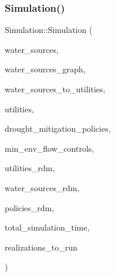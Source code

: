\subsubsection{\texorpdfstring{Simulation()}{Simulation()}\hspace{0.1cm}{\footnotesize\ttfamily [1/3]}}
{\footnotesize\ttfamily Simulation\+::\+Simulation (\begin{DoxyParamCaption}\item[{vector$<$ \mbox{\hyperlink{classWaterSource}{Water\+Source}} $\ast$$>$ \&}]{water\+\_\+sources,  }\item[{\mbox{\hyperlink{classGraph}{Graph}} \&}]{water\+\_\+sources\+\_\+graph,  }\item[{const vector$<$ vector$<$ int $>$$>$ \&}]{water\+\_\+sources\+\_\+to\+\_\+utilities,  }\item[{vector$<$ \mbox{\hyperlink{classUtility}{Utility}} $\ast$$>$ \&}]{utilities,  }\item[{const vector$<$ \mbox{\hyperlink{classDroughtMitigationPolicy}{Drought\+Mitigation\+Policy}} $\ast$$>$ \&}]{drought\+\_\+mitigation\+\_\+policies,  }\item[{vector$<$ \mbox{\hyperlink{classMinEnvFlowControl}{Min\+Env\+Flow\+Control}} $\ast$$>$ \&}]{min\+\_\+env\+\_\+flow\+\_\+controls,  }\item[{vector$<$ vector$<$ double $>$$>$ \&}]{utilities\+\_\+rdm,  }\item[{vector$<$ vector$<$ double $>$$>$ \&}]{water\+\_\+sources\+\_\+rdm,  }\item[{vector$<$ vector$<$ double $>$$>$ \&}]{policies\+\_\+rdm,  }\item[{const unsigned long}]{total\+\_\+simulation\+\_\+time,  }\item[{vector$<$ unsigned long $>$ \&}]{realizations\+\_\+to\+\_\+run }\end{DoxyParamCaption})}

\mbox{\label{classSimulation_aa225c1836ebd788eb0f35c8cd53f0533_aa225c1836ebd788eb0f35c8cd53f0533}} 
